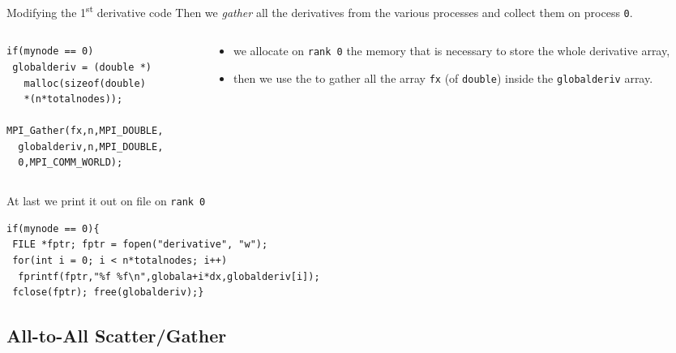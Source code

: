 \documentclass[xcolor={svgnames,usenames}]{beamer}
\begin{document}
\begin{frame}[fragile]{Modifying the 1\textsuperscript{st} derivative code}
Then we \emph{gather} all the derivatives from the various processes and collect them on process \texttt{0}.
\begin{columns}
	\begin{column}{0.5\columnwidth}
\begin{verbatim}
if(mynode == 0)
 globalderiv = (double *) 
   malloc(sizeof(double) 
   *(n*totalnodes));

MPI_Gather(fx,n,MPI_DOUBLE,
  globalderiv,n,MPI_DOUBLE,
  0,MPI_COMM_WORLD);
\end{verbatim}
	\end{column}
\begin{column}{0.5\columnwidth}
\begin{itemize}
	\item we allocate on \texttt{rank 0} the memory that is necessary to store the whole derivative array,
	\item then we use the  to gather all the array \texttt{fx} (of \texttt{double}) inside
	the \texttt{globalderiv} array.
\end{itemize}
\end{column}
\end{columns}

At last we print it out on file on \texttt{rank 0}
\begin{verbatim}
if(mynode == 0){
 FILE *fptr; fptr = fopen("derivative", "w");
 for(int i = 0; i < n*totalnodes; i++)
  fprintf(fptr,"%f %f\n",globala+i*dx,globalderiv[i]);
 fclose(fptr); free(globalderiv);}
\end{verbatim}
\end{frame}

\subsection{All-to-All Scatter/Gather}
\end{document}
